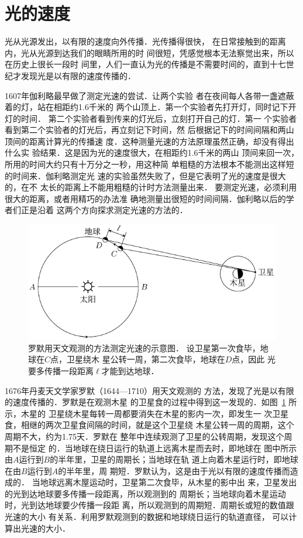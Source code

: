 \section{光的速度}
光从光源发出，以有限的速度向外传播．光传播得很快，
在日常接触到的距离内，光从光源到达我们的眼睛所用的时
间很短，凭感觉根本无法察觉出来，所以在历史上很长一段时
间里，人们一直认为光的传播是不需要时间的，直到十七世
纪才发现光是以有限的速度传播的．

1607年伽利略最早做了测定光速的尝试．让两个实验
者在夜间每人各带一盏遮蔽着的灯，站在相距约1.6千米的
两个山顶上．第一个实验者先打开灯，同时记下开灯的时间．
第二个实验者看到传来的灯光后，立刻打开自己的灯．第一
个实验者看到第二个实验者的灯光后，再立刻记下时间，然
后根据记下的时间间隔和两山顶间的距离计算光的传播速
度．这种测量光速的方法原理虽然正确，却没有得出什么实
验结果．这是因为光的速度很大，在相距约1.6千米的两山
顶间来回一次，所用的时间大约只有十万分之一秒，用这种简
单粗糙的方法根本不能测出这样短的时间来．伽利略测定光
速的实验虽然失败了，但是它表明了光的速度是很大的，在不
太长的距离上不能用粗糙的计时方法测量出来．
要测定光速，必须利用很大的距离，或者用精巧的办法准
确地测量出很短的时间间隔．伽利略以后的学者们正是沿着
这两个方向探求测定光速的方法的．

\begin{figure}[htbp]
    \centering
    \includegraphics{fig/C/5-4.pdf}
    \caption{罗默用天文观测的方法测定光速的示意图．
    设卫星第一次食毕，地球在$C$点，卫星绕木
    星公转一周，第二次食毕，地球在$D$点，因此
    光要多传播一段距离$\ell$才能到达地球．}\label{fig_C_5-4}
\end{figure}

1676年丹麦天文学家罗默（1644—1710）用天文观测的
方法，发现了光是以有限的速度传播的．罗默是在观测木星
的卫星食的过程中得到这一发现的．如图~\ref{fig_C_5-4} 所示，木星的
卫星绕木星每转一周都要消失在木星的影内一次，即发生一
次卫星食，相继的两次卫星食间隔的时间，就是这个卫星绕
木星公转一周的周期，这个周期不大，约为1.75天．罗默在
整年中连续观测了卫星的公转周期，发现这个周期不是恒定
的．当地球在绕日运行的轨道上远离木星而去时，即地球在
图中所示由$A$运行到$B$的半年里，卫星的周期长；当地球在轨
道上向着木星运行时，即地球在由$B$运行到$A$的半年里，周
期短．罗默认为，这是由于光以有限的速度传播而造成的．
当地球远离木屋运动时，卫星第二次食毕，从木星的影中出
来，卫星发出的光到达地球要多传播一段距离，所以观测到的
周期长；当地球向着木星运动时，光到达地球要少传播一段距
离，所以观测到的周期短．周期长或短的数值跟光速的大小
有关系．利用罗默观测到的数据和地球绕日运行的轨道直径，
可以计算出光速的大小．

